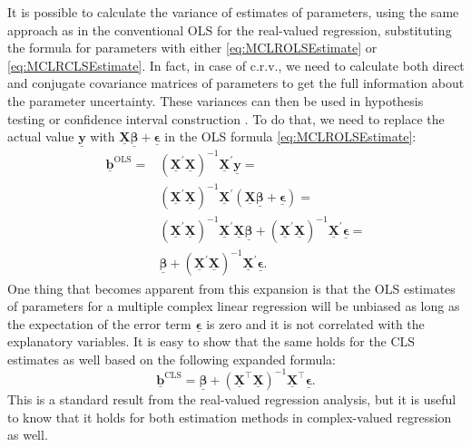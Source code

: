 \documentclass[
]{book}
\begin{document}
It is possible to calculate the variance of estimates of parameters, using the same approach as in the conventional OLS for the real-valued regression, substituting the formula for parameters with either \eqref{eq:MCLROLSEstimate} or \eqref{eq:MCLRCLSEstimate}. In fact, in case of c.r.v., we need to calculate both direct and conjugate covariance matrices of parameters to get the full information about the parameter uncertainty. These variances can then be used in hypothesis testing or confidence interval construction \citep[their distribution was studied by][]{Tavares2007}. To do that, we need to replace the actual value \(\underline{\mathbf{y}}\) with \(\underline{\mathbf{X}} \underline{\boldsymbol{\beta}} + \underline{\boldsymbol{\epsilon}}\) in the OLS formula \eqref{eq:MCLROLSEstimate}:
\begin{equation}
    \begin{aligned}
    \underline{\boldsymbol{b}}^{\text{OLS}} =
        & \left( \underline{\mathbf{X}}^\prime \underline{\mathbf{X}} \right)^{-1} \underline{\mathbf{X}}^\prime \underline{\mathbf{y}} = \\
        & \left( \underline{\mathbf{X}}^\prime \underline{\mathbf{X}} \right)^{-1} \underline{\mathbf{X}}^\prime (\underline{\mathbf{X}} \underline{\boldsymbol{\beta}} + \underline{\boldsymbol{\epsilon}}) = \\
        & \left( \underline{\mathbf{X}}^\prime \underline{\mathbf{X}} \right)^{-1} \underline{\mathbf{X}}^\prime \underline{\mathbf{X}} \underline{\boldsymbol{\beta}} + \left( \underline{\mathbf{X}}^\prime \underline{\mathbf{X}} \right)^{-1} \underline{\mathbf{X}}^\prime \underline{\boldsymbol{\epsilon}} = \\
        & \underline{\boldsymbol{\beta}} + \left( \underline{\mathbf{X}}^\prime \underline{\mathbf{X}} \right)^{-1} \underline{\mathbf{X}}^\prime \underline{\boldsymbol{\epsilon}} .
    \end{aligned}
    \label{eq:MCLROLSExpansion}
\end{equation}
One thing that becomes apparent from this expansion is that the OLS estimates of parameters for a multiple complex linear regression will be unbiased as long as the expectation of the error term \(\underline{\boldsymbol{\epsilon}}\) is zero and it is not correlated with the explanatory variables. It is easy to show that the same holds for the CLS estimates as well based on the following expanded formula:
\begin{equation}
    \underline{\boldsymbol{b}}^{\text{CLS}} = \underline{\boldsymbol{\beta}} + \left( \underline{\mathbf{X}}^\top \underline{\mathbf{X}} \right)^{-1} \underline{\mathbf{X}}^\top \underline{\boldsymbol{\epsilon}} .
    \label{eq:MCLRCLSExpansion}
\end{equation}
This is a standard result from the real-valued regression analysis, but it is useful to know that it holds for both estimation methods in complex-valued regression as well.
\end{document}
